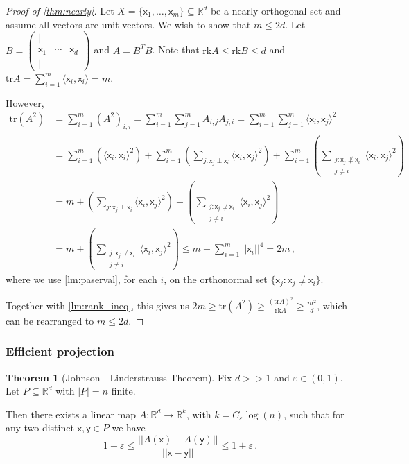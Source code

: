 \documentclass[12pt]{amsart}
\theoremstyle{definition}
\newtheorem{thm}{Theorem}[section]
\newcommand{\R}{\mathbb{R}}
\newcommand{\vx}{\mathsf{x}}
\newcommand{\vy}{\mathsf{y}}
\newcommand{\rk}{\mathrm{rk}}
\newcommand{\tr}{\mathrm{tr}}
\begin{document}
\begin{proof}[Proof of \cref{thm:nearly}]
Let $X = \{\vx_1, \ldots, \vx_m\}\subseteq \R^d$ be a nearly orthogonal set and assume all vectors are unit vectors.
We wish to show that $m \leq 2 d$.
Let $B = \begin{pmatrix}
| &  & | \\ \vx_1 & \cdots & \vx_d \\ | & & | \end{pmatrix}$ and $A = B^T B$.
Note that $\rk A \leq \rk B\leq d$ and $\tr A = \sum_{i=1}^m \langle \vx_i, \vx_i\rangle = m$.

However,
\begin{align*}
\tr (A^2) &= \sum_{i=1}^m (A^2)_{i, i} = \sum_{i=1}^m \sum_{j=1}^m A_{i, j} A_{j, i} = \sum_{i=1}^m \sum_{j=1}^m \langle \vx_i, \vx_j \rangle^2 \\
&= \sum_{i=1}^m \left(\langle \vx_i, \vx_i \rangle^2 \right)+ \sum_{i=1}^m\left( \sum_{j : \vx_j \perp \vx_i } \langle \vx_i, \vx_j \rangle^2 \right) + \sum_{i=1}^m\left( \sum_{\substack{j : \vx_j \not\perp \vx_i \\ j \neq i}} \langle \vx_i, \vx_j \rangle^2 \right) \\
&= m + \left( \sum_{j : \vx_j \perp \vx_i } \langle \vx_i, \vx_j \rangle^2 \right) + \left( \sum_{\substack{j : \vx_j \not\perp \vx_i \\ j \neq i}} \langle \vx_i, \vx_j \rangle^2 \right)\\
&= m + \left( \sum_{\substack{j : \vx_j \not\perp \vx_i \\ j \neq i}} \langle \vx_i, \vx_j \rangle^2 \right) \leq m + \sum_{i=1}^m ||\vx_i ||^4  = 2m  \, , 
\end{align*}
where we use \cref{lm:paserval}, for each $i$, on the orthonormal set $\{\vx_j : \vx_j \not\perp \vx_i\}$.

Together with \cref{lm:rank_ineq}, this gives us $ 2m \geq \tr(A^2) \geq \frac{(\tr A )^2}{\rk A}\geq \frac{m^2}{d}$, which can be rearranged to $m \leq 2d $.
\end{proof}

\subsubsection*{Efficient projection}




\begin{thm}[Johnson - Linderstrauss Theorem]\label{thm:JL}
Fix $d >> 1$ and $\varepsilon \in (0, 1)$.
Let $P \subseteq \R^d$ with $|P| = n$ finite.

Then there exists a linear map $A:\R^d \to \R^k$, with $k = C_{\varepsilon} \log (n)$, such that for any two distinct $\vx, \vy \in P$ we have
$$ 1 - \varepsilon \leq \frac{||A(\vx) - A(\vy)||}{||\vx - \vy||} \leq 1 + \varepsilon \, . $$
\end{thm}
\end{document}

